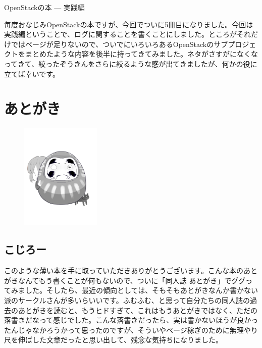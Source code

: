 \documentclass[9pt,b5paper,papersize,openany]{jsbook}
\begin{document}
{\Huge OpenStackの本 --- 実践編}

\vspace*{10mm}
\begin{minipage}{0.5\textwidth}
	\scriptsize 毎度おなじみOpenStackの本ですが、今回でついに5冊目になりました。今回は実践編ということで、ログに関することを書くことにしました。ところがそれだけではページが足りないので、ついでにいろいろあるOpenStackのサブプロジェクトをまとめたような内容を後半に持ってきてみました。ネタがさすがになくなってきて、絞ったぞうきんをさらに絞るような感が出てきましたが、何かの役に立てば幸いです。
\end{minipage}

\vspace*{-1truein}
\begin{minipage}{\textwidth}
	\tableofcontents
\end{minipage}

\thispagestyle{empty}





\chapter{あとがき}

\begin{figure}
	\vspace*{-14\intextsep}
	\begin{center}
		\includegraphics[width=0.34\textwidth]{img/daruma.png}
	\end{center}
\end{figure}

\section*{こじろー}

このような薄い本を手に取っていただきありがとうございます。こんな本のあとがきなんてもう書くことが何もないので、ついに「同人誌 あとがき」でググってみました。そしたら、最近の傾向としては、そもそもあとがきなんか書かない派のサークルさんが多いらいいです。ふむふむ、と思って自分たちの同人誌の過去のあとがきを読むと、もうヒドすぎて、これはもうあとがきではなく、ただの落書きだなって感じでした。こんな落書きだったら、実は書かないほうが良かったんじゃなかろうかって思ったのですが、そういやページ稼ぎのために無理やり尺を伸ばした文章だったと思い出して、残念な気持ちになりました。
\end{document}
